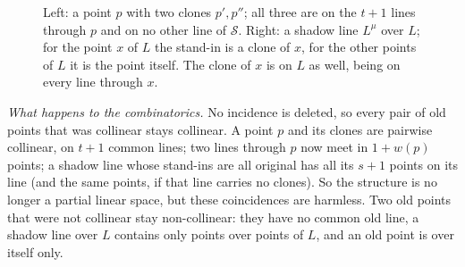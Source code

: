 \documentclass[11pt]{amsart}
\theoremstyle{definition}
\theoremstyle{remark}
\newcommand{\cS}{\mathcal{S}}
\begin{document}
\begin{figure}[ht]
\centering
{}
\caption{Left: a point $p$ with two clones $p',p''$; all three are on the $t+1$ lines through $p$ and on no other line of $\cS$. Right: a shadow line $L^\mu$ over $L$; for the point $x$ of $L$ the stand-in is a clone of $x$, for the other points of $L$ it is the point itself. The clone of $x$ is on $L$ as well, being on every line through $x$.}
\label{fig:clones}
\end{figure}

\emph{What happens to the combinatorics.} No incidence is deleted, so every pair of old points that was collinear stays collinear. A point $p$ and its clones are pairwise collinear, on $t+1$ common lines; two lines through $p$ now meet in $1+w(p)$ points; a shadow line whose stand-ins are all original has all its $s+1$ points on its line (and the same points, if that line carries no clones). So the structure is no longer a partial linear space, but these coincidences are harmless. Two old points that were not collinear stay non-collinear: they have no common old line, a shadow line over $L$ contains only points over points of $L$, and an old point is over itself only.
\end{document}
